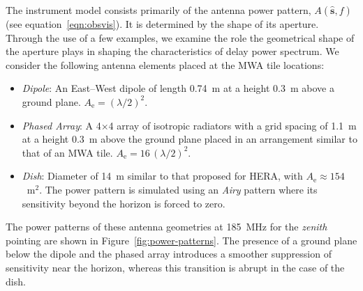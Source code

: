 \documentclass[preprint2,iop,numberedappendix,twocolappendix,appendixfloats]{emulateapj}
\begin{document}
The instrument model consists primarily of the antenna power pattern, $A(\hat{\boldsymbol{s}},f)$ (see equation~\ref{eqn:obsvis}). It is determined by the shape of its aperture. Through the use of a few examples, we examine the role the geometrical shape of the aperture plays in shaping the characteristics of delay power spectrum. We consider the following antenna elements placed at the MWA tile locations:
\begin{itemize}
\item {\it Dipole}: An East--West dipole of length 0.74~m at a height 0.3~m above a ground plane. $A_\textrm{e}=(\lambda/2)^2$.
\item {\it Phased Array}: A 4$\times$4 array of isotropic radiators with a grid spacing of 1.1~m at a height 0.3~m above the ground plane placed in an arrangement similar to that of an MWA tile. $A_\textrm{e}=16\,(\lambda/2)^2$. 
\item {\it Dish}: Diameter of 14~m similar to that proposed for HERA, with $A_\textrm{e}\approx 154$~m$^2$. The power pattern is simulated using an {\it Airy} pattern where its sensitivity beyond the horizon is forced to zero.
\end{itemize}

The power patterns of these antenna geometries at 185~MHz for the {\it zenith} pointing are shown in Figure~\ref{fig:power-patterns}. The presence of a ground plane below the dipole and the phased array introduces a smoother suppression of sensitivity near the horizon, whereas this transition is abrupt in the case of the dish.
\end{document}
